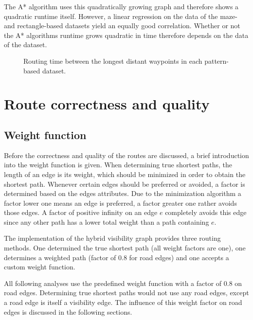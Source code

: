 			The A* algorithm uses this quadratically growing graph and therefore shows a quadratic runtime itself.
			However, a linear regression on the data of the maze- and rectangle-based datasets yield an equally good correlation.
			Whether or not the A* algorithms runtime grows quadratic in time therefore depends on the data of the dataset.
			
			\begin{figure}[h!]
				\hspace{-20pt}
				
				\caption{Routing time between the longest distant waypoints in each pattern-based dataset.}
				\label{fig:eval-pattern-routing-details}
			\end{figure}
		
\section{Route correctness and quality}

	\subsection{Weight function}
	
		Before the correctness and quality of the routes are discussed, a brief introduction into the weight function is given.
		When determining true shortest paths, the length of an edge is its weight, which should be minimized in order to obtain the shortest path.
		Whenever certain edges should be preferred or avoided, a factor is determined based on the edges attributes.
		Due to the minimization algorithm a factor lower one means an edge is preferred, a factor greater one rather avoids those edges.
		A factor of positive infinity on an edge $e$ completely avoids this edge since any other path has a lower total weight than a path containing $e$.
		
		The implementation of the hybrid visibility graph provides three routing methods.
		One determined the true shortest path (all weight factors are one), one determines a weighted path (factor of 0.8 for road edges) and one accepts a custom weight function.
		
		All following analyses use the predefined weight function with a factor of 0.8 on road edges.
		Determining true shortest paths would not use any road edges, except a road edge is itself a visibility edge.
		The influence of this weight factor on road edges is discussed in the following sections.

